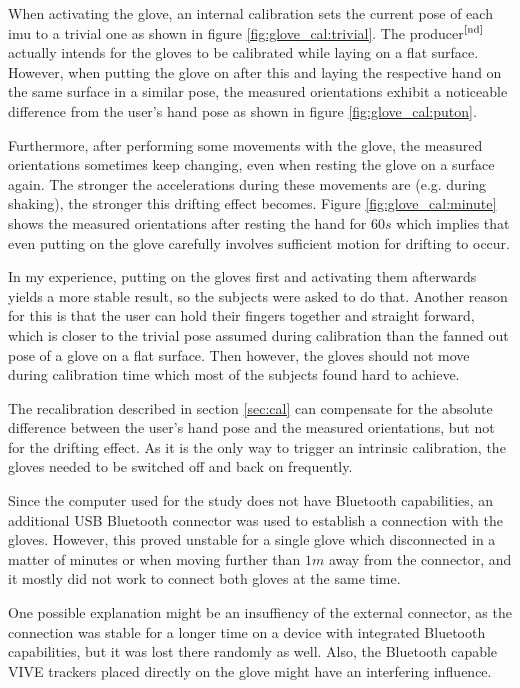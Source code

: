 \documentclass[hyperref, bachelorofscience]{cgvpub}
\newcommand{\newcite}[1]{$ ^{\text{\cite{#1}}} $}
\begin{document}
When activating the glove, an internal calibration sets the current pose of each \acrshort{imu} to a trivial one as shown in figure \ref{fig:glove_cal:trivial}. The producer\newcite{nd} actually intends for the gloves to be calibrated while laying on a flat surface. However, when putting the glove on after this and laying the respective hand on the same surface in a similar pose, the measured orientations exhibit a noticeable difference from the user's hand pose as shown in figure \ref{fig:glove_cal:puton}. 

Furthermore, after performing some movements with the glove, the measured orientations sometimes keep changing, even when resting the glove on a surface again. The stronger the accelerations during these movements are (e.g. during shaking), the stronger this drifting effect becomes. Figure \ref{fig:glove_cal:minute} shows the measured orientations after resting the hand for $ 60s $ which implies that even putting on the glove carefully involves sufficient motion for drifting to occur.

In my experience, putting on the gloves first and activating them afterwards yields a more stable result, so the subjects were asked to do that. Another reason for this is that the user can hold their fingers together and straight forward, which is closer to the trivial pose assumed during calibration than the fanned out pose of a glove on a flat surface. Then however, the gloves should not move during calibration time which most of the subjects found hard to achieve.

The recalibration described in section \ref{sec:cal} can compensate for the absolute difference between the user's hand pose and the measured orientations, but not for the drifting effect. As it is the only way to trigger an intrinsic calibration, the gloves needed to be switched off and back on frequently. 

Since the computer used for the study does not have Bluetooth capabilities, an additional USB Bluetooth connector was used to establish a connection with the gloves. However, this proved unstable for a single glove which disconnected in a matter of minutes or when moving further than $ 1m $ away from the connector, and it mostly did not work to connect both gloves at the same time. 

One possible explanation might be an insuffiency of the external connector, as the connection was stable for a longer time on a device with integrated Bluetooth capabilities, but it was lost there randomly as well. Also, the Bluetooth capable \Gls{VIVE} trackers placed directly on the glove might have an interfering influence.
\end{document}

